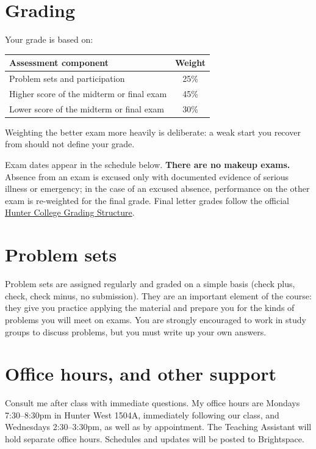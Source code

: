 \documentclass[11pt]{article}
\begin{document}
\section{Grading}
Your grade is based on:

\begin{center}
\begin{tabular}{lc}
\hline
\textbf{Assessment component} & \textbf{Weight}\\
\hline
Problem sets and participation & 25\%\\
Higher score of the midterm or final exam & 45\%\\
Lower score of the midterm or final exam & 30\%\\
\hline
\end{tabular}
\end{center}

Weighting the better exam more heavily is deliberate: a weak start you recover from should not define your grade.

Exam dates appear in the schedule below. \textbf{There are no makeup exams.} Absence from an exam is excused only with documented evidence of serious illness or emergency; in the case of an excused absence, performance on the other exam is re-weighted for the final grade. Final letter grades follow the official \href{https://www.hunter.cuny.edu/students/registration/records-and-transcripts/grading-structure/}{Hunter College Grading Structure}.

\section{Problem sets}
Problem sets are assigned regularly and graded on a simple basis (check plus, check, check minus, no submission). They are an important element of the course: they give you practice applying the material and prepare you for the kinds of problems you will meet on exams. You are strongly encouraged to work in study groups to discuss problems, but you must write up your own answers.

\section{Office hours, and other support}
Consult me after class with immediate questions. My office hours are Mondays 7:30--8:30pm in Hunter West 1504A, immediately following our class, and Wednesdays 2:30--3:30pm, as well as by appointment. The Teaching Assistant will hold separate office hours. Schedules and updates will be posted to Brightspace.
\end{document}

